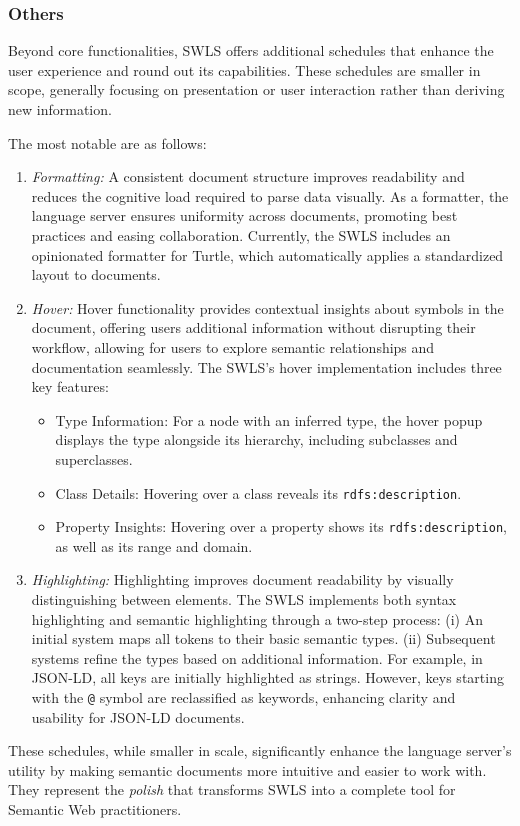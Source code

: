 \subsubsection{Others}

Beyond core functionalities, SWLS offers additional schedules that enhance the user experience and round out its capabilities.
These schedules are smaller in scope, generally focusing on presentation or user interaction rather than deriving new information.

The most notable are as follows:
\begin{enumerate}
  \item \textit{Formatting:}
    A consistent document structure improves readability and reduces the cognitive load required to parse data visually.
    As a formatter, the language server ensures uniformity across documents, promoting best practices and easing collaboration.
    Currently, the SWLS includes an opinionated formatter for Turtle, which automatically applies a standardized layout to documents.

  \item \textit{Hover:}
    Hover functionality provides contextual insights about symbols in the document, offering users additional information without disrupting their workflow,
    allowing for users to explore semantic relationships and documentation seamlessly.
    The SWLS’s hover implementation includes three key features:
    \begin{itemize}
      \item Type Information: For a node with an inferred type, the hover popup displays the type alongside its hierarchy, including subclasses and superclasses.
      \item Class Details: Hovering over a class reveals its \texttt{rdfs:description}.
      \item Property Insights: Hovering over a property shows its \texttt{rdfs:description}, as well as its range and domain.
    \end{itemize}

  \item \textit{Highlighting:}
    Highlighting improves document readability by visually distinguishing between elements.
    The SWLS implements both syntax highlighting and semantic highlighting through a two-step process:
        (i) An initial system maps all tokens to their basic semantic types.
        (ii) Subsequent systems refine the types based on additional information.
    For example, in JSON-LD, all keys are initially highlighted as strings.
    However, keys starting with the \texttt{@} symbol are reclassified as keywords, enhancing clarity and usability for JSON-LD documents.
\end{enumerate}

These schedules, while smaller in scale, significantly enhance the language server’s utility by making semantic documents more intuitive and easier to work with.
They represent the \textit{polish} that transforms SWLS into a complete tool for Semantic Web practitioners.
